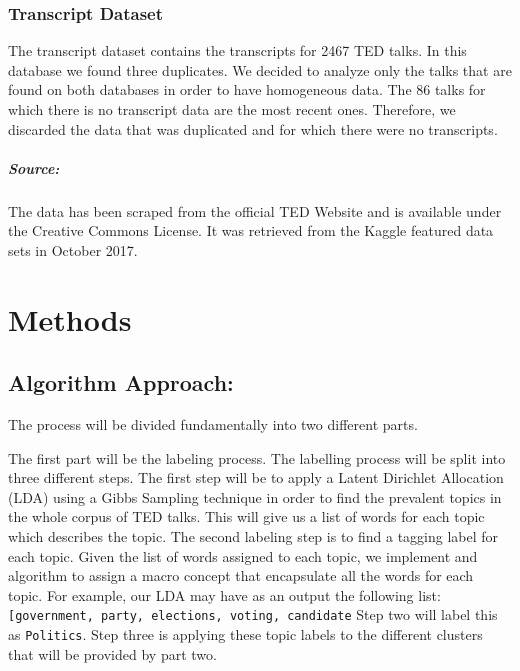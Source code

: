 \documentclass[11pt]{article}
\begin{document}
    \subsubsection{Transcript Dataset}\label{transcript-dataset}

The transcript dataset contains the transcripts for 2467 TED talks. In
this database we found three duplicates. We decided to analyze only the
talks that are found on both databases in order to have homogeneous
data. The 86 talks for which there is no transcript data are the most
recent ones. Therefore, we discarded the data that was duplicated and
for which there were no transcripts.

\subparagraph{Source:}\label{source}

The data has been scraped from the official TED Website and is available
under the Creative Commons License. It was retrieved from the Kaggle
featured data sets in October 2017.

    \section{Methods}\label{methods}

\subsection{Algorithm Approach:}\label{algorithm-approach}

The process will be divided fundamentally into two different parts.

The first part will be the labeling process. The labelling process will
be split into three different steps. The first step will be to apply a
Latent Dirichlet Allocation (LDA) using a Gibbs Sampling technique in
order to find the prevalent topics in the whole corpus of TED talks.
This will give us a list of words for each topic which describes the
topic. The second labeling step is to find a tagging label for each
topic. Given the list of words assigned to each topic, we implement and
algorithm to assign a macro concept that encapsulate all the words for
each topic. For example, our LDA may have as an output the following
list:
\texttt{{[}\textquotesingle{}government\textquotesingle{},\ \textquotesingle{}party\textquotesingle{},\ \textquotesingle{}elections\textquotesingle{},\ \textquotesingle{}voting\textquotesingle{},\ \textquotesingle{}candidate\textquotesingle{}{]}}
Step two will label this as \texttt{Politics}. Step three is applying
these topic labels to the different clusters that will be provided by
part two.
\end{document}
